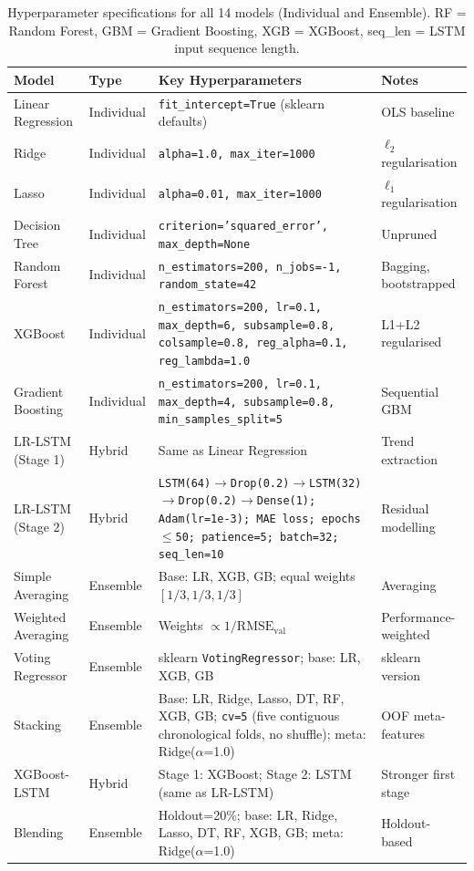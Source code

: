\begin{table}[t]
\centering
\caption{Hyperparameter specifications for all 14 models (Individual and Ensemble). RF = Random Forest, GBM = Gradient Boosting, XGB = XGBoost, seq\_len = LSTM input sequence length.\label{tab:hyperparams}}
\footnotesize
\setlength{\tabcolsep}{4pt}
\begin{tabularx}{\textwidth}{@{}
 >{\raggedright\arraybackslash}p{2.4cm}
 >{\raggedright\arraybackslash}p{1.5cm}
 >{\raggedright\arraybackslash}X
 >{\raggedright\arraybackslash}p{2.2cm} @{}}
\toprule
\textbf{Model} & \textbf{Type} & \textbf{Key Hyperparameters} & \textbf{Notes} \\
\midrule
Linear Regression & Individual & \texttt{fit\_intercept=True} (sklearn defaults) & OLS baseline \\
Ridge & Individual & \texttt{alpha=1.0, max\_iter=1000} & $\ell_2$ regularisation \\
Lasso & Individual & \texttt{alpha=0.01, max\_iter=1000} & $\ell_1$ regularisation \\
Decision Tree & Individual & \texttt{criterion='squared\_error', max\_depth=None} & Unpruned \\
Random Forest & Individual & \texttt{n\_estimators=200, n\_jobs=-1, random\_state=42} & Bagging, bootstrapped \\
XGBoost & Individual & \texttt{n\_estimators=200, lr=0.1, max\_depth=6, subsample=0.8, colsample=0.8, reg\_alpha=0.1, reg\_lambda=1.0} & L1+L2 regularised \\
Gradient Boosting & Individual & \texttt{n\_estimators=200, lr=0.1, max\_depth=4, subsample=0.8, min\_samples\_split=5} & Sequential GBM \\
LR-LSTM (Stage 1) & Hybrid & Same as Linear Regression & Trend extraction \\
LR-LSTM (Stage 2) & Hybrid & \texttt{LSTM(64)$\to$Drop(0.2)$\to$LSTM(32)$\to$Drop(0.2)$\to$Dense(1); Adam(lr=1e-3); MAE loss; epochs$\le$50; patience=5; batch=32; seq\_len=10} & Residual modelling \\
Simple Averaging & Ensemble & Base: LR, XGB, GB; equal weights $[1/3,1/3,1/3]$ & Averaging \\
Weighted Averaging & Ensemble & Weights $\propto 1/\text{RMSE}_{\text{val}}$ & Performance-weighted \\
Voting Regressor & Ensemble & sklearn \texttt{VotingRegressor}; base: LR, XGB, GB & sklearn version \\
Stacking & Ensemble & Base: LR, Ridge, Lasso, DT, RF, XGB, GB; \texttt{cv=5} (five contiguous chronological folds, no shuffle); meta: Ridge($\alpha$=1.0) & OOF meta-features \\
XGBoost-LSTM & Hybrid & Stage 1: XGBoost; Stage 2: LSTM (same as LR-LSTM) & Stronger first stage \\
Blending & Ensemble & Holdout=20\%; base: LR, Ridge, Lasso, DT, RF, XGB, GB; meta: Ridge($\alpha$=1.0) & Holdout-based \\
\bottomrule
\end{tabularx}
\end{table}

